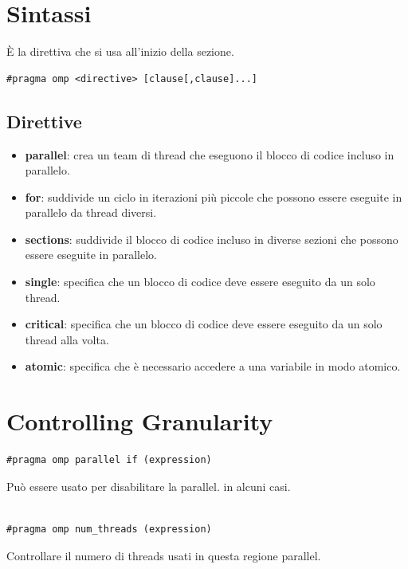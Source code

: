 \documentclass[a4paper, 12pt]{article}
\begin{document}
\newpage
\section{Sintassi}
È la direttiva che si usa all'inizio della sezione.
\begin{lstlisting}[style=cppstyle]
    #pragma omp <directive> [clause[,clause]...]
\end{lstlisting}

    \subsection{Direttive}
    \begin{itemize}
        \item \textbf{parallel}: crea un team di thread che eseguono il blocco di codice incluso in parallelo.
        \item \textbf{for}: suddivide un ciclo in iterazioni più piccole che possono essere eseguite in parallelo da thread diversi.
        \item \textbf{sections}: suddivide il blocco di codice incluso in diverse sezioni che possono essere eseguite in parallelo.
        \item \textbf{single}: specifica che un blocco di codice deve essere eseguito da un solo thread.
        \item \textbf{critical}: specifica che un blocco di codice deve essere eseguito da un solo thread alla volta.
        \item \textbf{atomic}: specifica che è necessario accedere a una variabile in modo atomico.
    \end{itemize}

\section{Controlling Granularity}
\begin{lstlisting}[style=cppstyle]
    #pragma omp parallel if (expression)
\end{lstlisting}
Può essere usato per disabilitare la parallel. in alcuni casi.
\\ \\
\begin{lstlisting}[style=cppstyle]
    #pragma omp num_threads (expression)
\end{lstlisting}
Controllare il numero di threads usati in questa regione parallel.

\newpage
\end{document}
